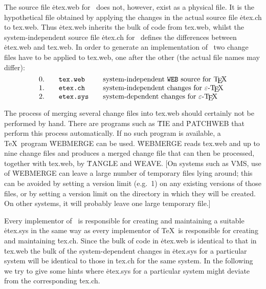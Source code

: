 The source file \.{etex.web} for \eTeX\ does not, however, exist as a
physical file.  It is the hypothetical file obtained by applying the
changes in the actual source file \.{etex.ch} to \.{tex.web}.  Thus
\.{etex.web} inherits the bulk of code from \.{tex.web}, whilst the
system-independent source file \.{etex.ch} for \eTeX\ defines the
differences between \.{etex.web} and \.{tex.web}.  In order to generate
an implementation of \eTeX\ two change files have to be applied to
\.{tex.web}, one after the other (the actual file names may differ):
$$
\vcenter{\halign{#\hfil&\qquad\.{#}\hfil&\qquad#\hfil\cr
0.&tex.web&system-independent \.{WEB} source for \TeX\cr
1.&etex.ch&system-independent changes for \eTeX\cr
2.&etex.sys&system-dependent changes for \eTeX\cr
}}
$$

The process of merging several change files into \.{tex.web} should
certainly not be performed by hand.  There are programs such as \.{TIE}
and \.{PATCHWEB} that perform this process automatically.  If no such
program is available, a \TeX\ program \.{WEBMERGE} can be used.
\.{WEBMERGE} reads \.{tex.web} and up to nine change files and produces
a merged change file that can then be processed, together with
\.{tex.web}, by \.{TANGLE} and \.{WEAVE}.  [On systems such as VMS, use
of \.{WEBMERGE} can leave a large number of temporary files
lying around; this can be avoided by setting a version limit (e.g.~1) on any
existing versions of those files, or by setting a version limit on the
directory in which they will be created.  On other systems, it will probably
leave one large temporary file.]

Every implementor of \eTeX\ is responsible for creating and maintaining
a suitable \.{etex.sys} in the same way as every implementor of \TeX\
is responsible for creating and maintaining \.{tex.ch}.  Since the bulk
of code in \.{etex.web} is identical to that in \.{tex.web} the bulk of
the system-dependent changes in \.{etex.sys} for a particular system
will be identical to those in \.{tex.ch} for the same system.  In the
following we try to give some hints where \.{etex.sys} for a particular
system might deviate from the corresponding \.{tex.ch}.

